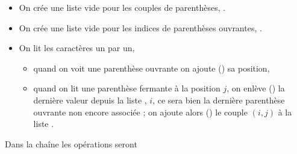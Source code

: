 \begin{itemize}
\item On crée une liste vide pour les couples de parenthèses, .
\item On crée une liste vide pour les indices de parenthèses ouvrantes, .
\item On lit les caractères un par un,
\begin{itemize}
\item quand on voit une parenthèse ouvrante on ajoute () sa position,
\item quand on lit une parenthèse fermante à la position $j$,  on enlève () la dernière valeur depuis la liste , $i$,  ce sera bien la dernière parenthèse ouvrante non encore associée ; on ajoute alors () le couple $(i, j)$ à la liste .
\end{itemize}
\end{itemize}

Dans la chaîne  les opérations  seront 

